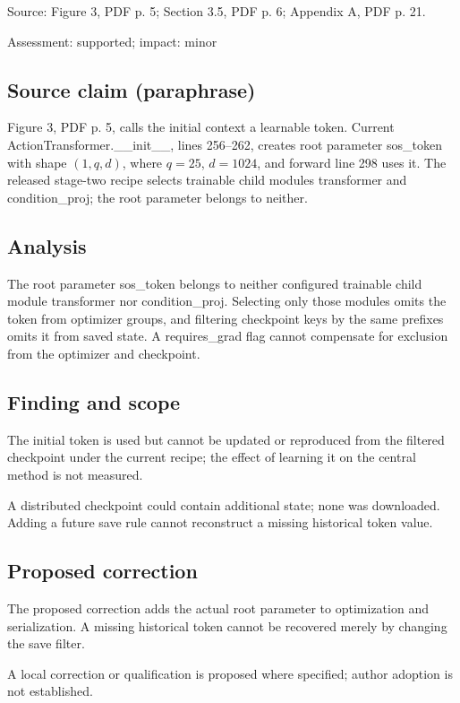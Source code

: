 \documentclass[11pt]{article}
\begin{document}
Source: Figure 3, PDF p. 5; Section 3.5, PDF p. 6; Appendix A, PDF p. 21.

Assessment: supported; impact: minor

\subsection*{Source claim (paraphrase)}

Figure 3, PDF p. 5, calls the initial context a learnable token. Current ActionTransformer.\_\_init\_\_, lines 256–262, creates root parameter sos\_token with shape \((1,q,d)\), where \(q=25\), \(d=1024\), and forward line 298 uses it. The released stage-two recipe selects trainable child modules transformer and condition\_proj; the root parameter belongs to neither.

\subsection*{Analysis}

The root parameter sos\_token belongs to neither configured trainable child module transformer nor condition\_proj. Selecting only those modules omits the token from optimizer groups, and filtering checkpoint keys by the same prefixes omits it from saved state. A requires\_grad flag cannot compensate for exclusion from the optimizer and checkpoint.

\subsection*{Finding and scope}

The initial token is used but cannot be updated or reproduced from the filtered checkpoint under the current recipe; the effect of learning it on the central method is not measured.

A distributed checkpoint could contain additional state; none was downloaded. Adding a future save rule cannot reconstruct a missing historical token value.

\subsection*{Proposed correction}

The proposed correction adds the actual root parameter to optimization and serialization. A missing historical token cannot be recovered merely by changing the save filter.

A local correction or qualification is proposed where specified; author adoption is not established.
\end{document}

